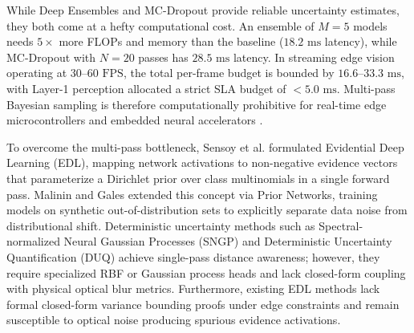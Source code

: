 \documentclass[conference]{IEEEtran}
\begin{document}
While Deep Ensembles and MC-Dropout provide reliable uncertainty estimates, they both come at a hefty computational cost. An ensemble of $M = 5$ models needs $5\times$ more FLOPs and memory than the baseline ($18.2\text{ ms}$ latency), while MC-Dropout with $N = 20$ passes has $28.5\text{ ms}$ latency. In streaming edge vision operating at $30\text{--}60\text{ FPS}$, the total per-frame budget is bounded by $16.6\text{--}33.3\text{ ms}$, with Layer-1 perception allocated a strict SLA budget of $<5.0\text{ ms}$. Multi-pass Bayesian sampling is therefore computationally prohibitive for real-time edge microcontrollers and embedded neural accelerators \cite{sandler2018mobilenetv2, howard2019searching}.

To overcome the multi-pass bottleneck, Sensoy et al. \cite{sensoy2018evidential} formulated Evidential Deep Learning (EDL), mapping network activations to non-negative evidence vectors that parameterize a Dirichlet prior over class multinomials in a single forward pass. Malinin and Gales \cite{malinin2018predictive} extended this concept via Prior Networks, training models on synthetic out-of-distribution sets to explicitly separate data noise from distributional shift. Deterministic uncertainty methods such as Spectral-normalized Neural Gaussian Processes (SNGP) \cite{liu2020simple} and Deterministic Uncertainty Quantification (DUQ) \cite{vanamersfoort2020uncertainty} achieve single-pass distance awareness; however, they require specialized RBF or Gaussian process heads and lack closed-form coupling with physical optical blur metrics. Furthermore, existing EDL methods lack formal closed-form variance bounding proofs under edge constraints and remain susceptible to optical noise producing spurious evidence activations.
\end{document}
